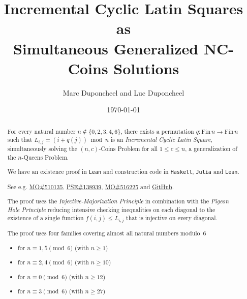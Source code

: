 \documentclass[11pt,a4paper]{article}
\title{\textbf{
  Incremental Cyclic Latin Squares \\ 
  as \\
  Simultaneous Generalized NC-Coins Solutions
}}
\author{Marc Duponcheel and Luc Duponcheel
}
\date{\today}
\theoremstyle{remark}
\begin{document}
\maketitle

\begin{abstract}

\noindent For every natural number $n \notin \{0, 2, 3, 4, 6\}$, there exists a permutation 
$q : \mathrm{Fin}\,n \to \mathrm{Fin}\,n$ such that
$L_{i,j} = (i + q(j)) \bmod n$ is an \emph{Incremental Cyclic Latin Square}, simultaneously solving
the $(n,c)$-Coins Problem for all $1 \le c \le n$, a generalization of the $n$-Queens Problem.

\vspace{12pt}

\noindent We have an existence proof in {\tt Lean} and construction code in {\tt Haskell},
{\tt Julia} and {\tt Lean}.

\vspace{12pt}

\noindent See e.g. \href{https://mathoverflow.net/questions/510135/placing-n-cdot-m-coins-on-an-n-times-n-board-generalizing-the-n-queens-p}{MO\hspace{-0.5pt}\#\hspace{-0.5pt}510135}, 
\href{https://puzzling.stackexchange.com/questions/138939/place-as-many-queens-as-you-can}{PSE\hspace{-0.5pt}\#\hspace{-0.5pt}138939},
\href{https://mathoverflow.net/questions/516225/universal-board-encoding-placement-of-n-cdot-m-coins-on-an-n-times-n-board}{MO\hspace{-0.5pt}\#\hspace{-0.5pt}516225} and
\href{https://github.com/NofanTasi/incremental-nc-coins-problem}{GitHub}.

\vspace{12pt}

\noindent The proof uses the \emph{Injective-Majorization Principle} in combination with the
\emph{Pigeon Hole Principle} reducing intensive checking inequalities on each diagonal to the
existence of a single function $f(i,j) \le L_{i,j}$ that is injective on every diagonal. 

\vspace{12pt}

\noindent The proof uses four families covering almost all natural numbers modulo~$6$
\begin{itemize}
\item for $n \equiv 1,5 \pmod 6$ (with $n \ge 1$)
\item for $n \equiv 2,4 \pmod 6$ (with $n \ge 10$)
\item for $n \equiv 0 \pmod 6$ (with $n \ge 12$)
\item for $n \equiv 3 \pmod 6$ (with $n \ge 27$)
\end{itemize}


\end{abstract}
\end{document}
